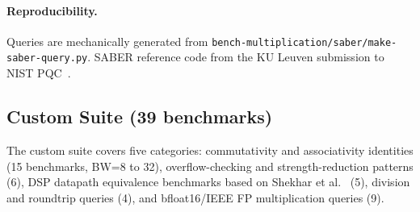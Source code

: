 \documentclass[runningheads]{llncs}
\begin{document}
\paragraph{Reproducibility.}
Queries are mechanically generated from
\texttt{bench-multiplication/saber/make-saber-query.py}. SABER
reference code from the KU Leuven submission to NIST
PQC~\cite{KULeuvenSABER}.

\subsection{Custom Suite (39 benchmarks)}
\label{sec:eval-custom}

The custom suite covers five categories: commutativity and
associativity identities (15 benchmarks, BW=8 to 32),
overflow-checking and strength-reduction patterns (6), DSP
datapath equivalence benchmarks based on
Shekhar et al.~\cite{shekhar2007equivalence} (5), division and
roundtrip queries (4), and bfloat16/IEEE FP multiplication
queries (9).
\end{document}
